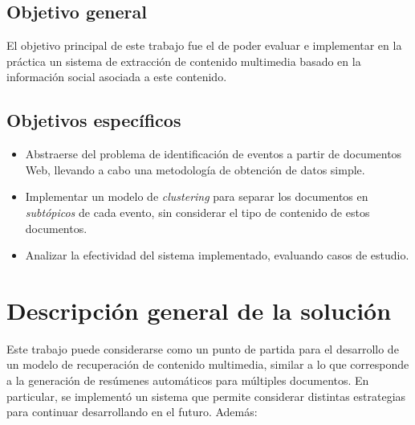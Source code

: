 \subsection{Objetivo general}
\label{sec-1.2.1}


    El objetivo principal de este trabajo fue el de poder evaluar e
    implementar en la práctica un sistema de extracción de contenido
    multimedia basado en la información social asociada a este
    contenido.

\subsection{Objetivos específicos}
\label{sec-1.2.2}


\begin{itemize}
\item Abstraerse del problema de identificación de eventos a partir de
      documentos Web, llevando a cabo una metodología de obtención de
      datos simple.
\item Implementar un modelo de \emph{clustering} para separar los
      documentos en \emph{subtópicos} de cada evento, sin considerar el
      tipo de contenido de estos documentos.
\item Analizar la efectividad del sistema implementado, evaluando
      casos de estudio.
\end{itemize}
\section{Descripción general de la solución}
\label{sec-1.3}


   Este trabajo puede considerarse como un punto de partida para el
   desarrollo de un modelo de recuperación de contenido multimedia,
   similar a lo que corresponde a la generación de resúmenes
   automáticos para múltiples documentos. En particular, se implementó
   un sistema que permite considerar distintas estrategias para
   continuar desarrollando en el futuro. Además:

